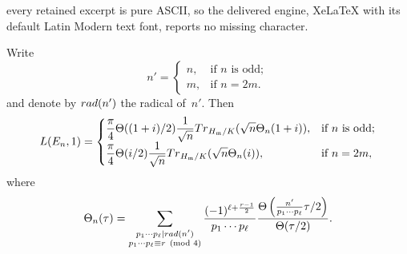 \documentclass[10pt,a4paper]{amsart}
\begin{document}
every retained excerpt is pure ASCII, so the delivered engine, XeLaTeX with its default Latin Modern text font, reports no missing character.
\begin{theorem}\label{main2}
Write 
$$
n'=\begin{cases}
    n,&\mbox{if $n$ is odd};\\
    m,&\mbox{if $n=2m$.}
\end{cases}
$$
and denote by ${\rm rad}(n')$ the radical of~$n'$. Then
$$
L(E_{n},1)=\begin{cases}
    \displaystyle{\frac{\pi}{4}\Theta((1+i)/2)\frac{1}{\sqrt{n}}{\rm Tr}_{H_{\mathfrak{m}}/K}(\sqrt{n}\Theta_{n}(1+i))},&\mbox{if $n$ is odd};\\
    \displaystyle{\frac{\pi}{4}\Theta(i/2)\frac{1}{\sqrt{n}}{\rm Tr}_{H_{\mathfrak{m}}/K}(\sqrt{n}\Theta_{n}(i))},&\mbox{if $n=2m$},
\end{cases}
$$
    where
    $$
    \Theta_{n}(\tau)=\sum_{\substack{p_{1}\cdots p_{\ell}|{\rm rad}(n')\\ p_{1}\cdots p_{\ell}\equiv r\pmod{4}}}\frac{(-1)^{\ell+\frac{r-1}{2}}}{p_{1}\cdots p_{\ell}}\frac{\Theta\left(\frac{n'}{p_{1}\cdots p_{\ell}}\tau/2\right)}{\Theta(\tau/2)}.
    $$
\end{theorem}
\end{document}
